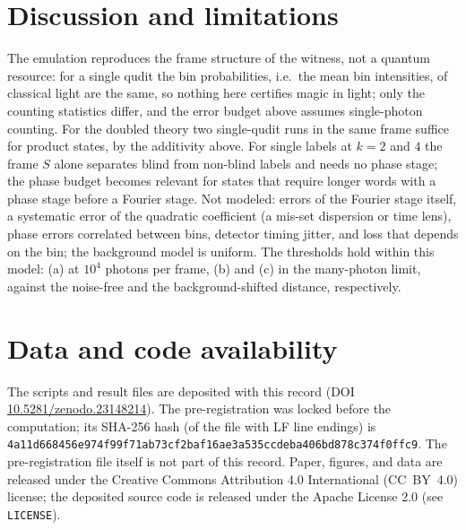 \documentclass[aps,pra,reprint,superscriptaddress,nofootinbib]{revtex4-2}
\begin{document}
\section{Discussion and limitations}
The emulation reproduces the frame structure of the witness, not a quantum resource: for a single qudit the bin probabilities, i.e.\ the mean bin intensities, of classical light are the same, so nothing here certifies magic in light; only the counting statistics differ, and the error budget above assumes single-photon counting.
For the doubled theory two single-qudit runs in the same frame suffice for product states, by the additivity above.
For single labels at $k=2$ and $4$ the frame $S$ alone separates blind from non-blind labels and needs no phase stage; the phase budget becomes relevant for states that require longer words with a phase stage before a Fourier stage.
Not modeled: errors of the Fourier stage itself, a systematic error of the quadratic coefficient (a mis-set dispersion or time lens), phase errors correlated between bins, detector timing jitter, and loss that depends on the bin; the background model is uniform.
The thresholds hold within this model: (a) at $10^4$ photons per frame, (b) and (c) in the many-photon limit, against the noise-free and the background-shifted distance, respectively.

\section*{Data and code availability}
The scripts and result files are deposited with this record (DOI \href{https://doi.org/10.5281/zenodo.23148214}{10.5281/zenodo.23148214}).
The pre-registration was locked before the computation; its SHA-256 hash (of the file with LF line endings) is \texttt{4a11d668456e974f99f71ab73cf2baf1}\allowbreak\texttt{6ae3a535ccdeba406bd878c374f0ffc9}. The pre-registration file itself is not part of this record.
Paper, figures, and data are released under the Creative Commons Attribution 4.0 International (CC~BY~4.0) license; the deposited source code is released under the Apache License 2.0 (see \texttt{LICENSE}).
\end{document}
